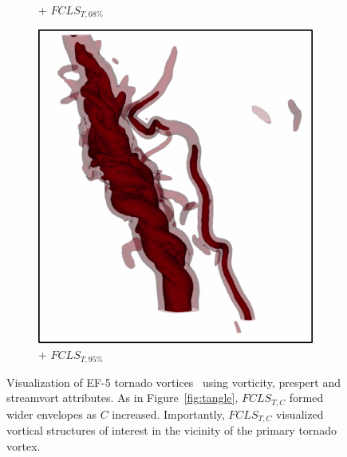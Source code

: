 \begin{figure}[!h]
\begin{subfigure}{0.20\linewidth}
\vspace{-1mm}
\caption{+ $FCLS_{T,68\%}$}
\label{fig:tornado_fls}
\end{subfigure}
\begin{subfigure}{0.20\linewidth}
\centering
\includegraphics[width=0.9\linewidth]{Images/Tornado/fcls_95.pdf}
\vspace{-1mm}
\caption{+ $FCLS_{T,95\%}$}
\label{fig:tornado_fcls}
\end{subfigure}
\caption{Visualization of EF-5 tornado vortices~\cite{atmos10100578} using vorticity, prespert and streamvort attributes. As in Figure~\ref{fig:tangle}, $FCLS_{T,C}$ formed wider envelopes as $C$ increased. Importantly, $FCLS_{T,C}$ visualized vortical structures of interest in the vicinity of the primary tornado vortex.}
\label{fig:tornado}
\end{figure}
